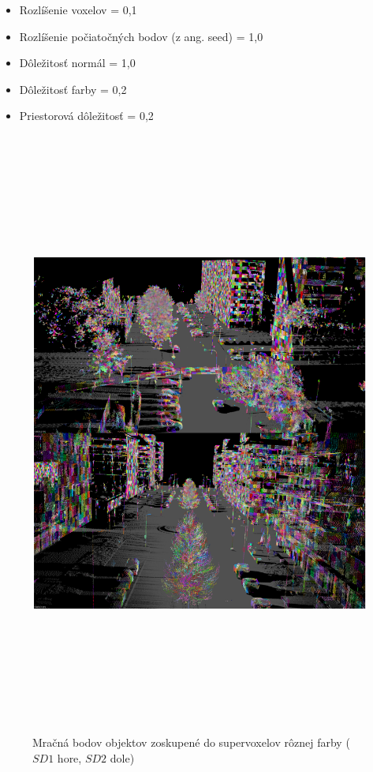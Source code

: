 \begin{itemize}
    \setlength\itemsep{0.2em}
    \item Rozlíšenie voxelov = 0,1
    \item Rozlíšenie počiatočných bodov (z ang. seed)  = 1,0
    \item Dôležitosť normál = 1,0
    \item Dôležitosť farby = 0,2
    \item Priestorová dôležitosť = 0,2
\end{itemize}

\newpage\vfill
\begin{figure}[ht]
  \centering
  \includegraphics[width=16cm, height=20cm]{img/supervoxel.png}
  \caption{Mračná bodov objektov zoskupené do supervoxelov rôznej farby ($SD1$ hore, $SD2$ dole)} 
  \label{fig:supervoxel}
\end{figure} 
\vfill\clearpage

